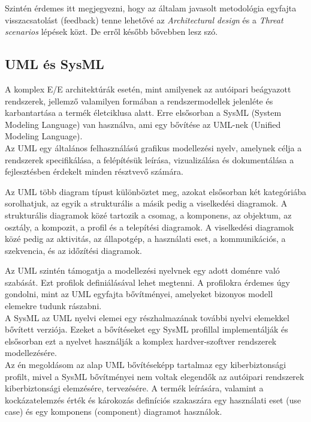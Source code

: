Szintén érdemes itt megjegyezni, hogy az általam javasolt metodológia egyfajta visszacsatolást (feedback) tenne lehetővé az \textit{Architectural design} és a \textit{Threat scenarios} lépések közt. De erről később bővebben lesz szó.

\subsection{UML és SysML}

A komplex E/E architektúrák esetén, mint amilyenek az autóipari beágyazott rendszerek, jellemző valamilyen formában a rendszermodellek jelenléte és karbantartása a termék életciklusa alatt. Erre elsősorban a SysML (System Modeling Language) van használva, ami egy bővítése az UML-nek (Unified Modeling Language).\\

Az UML egy általános felhasználású grafikus modellezési nyelv, amelynek célja a rendszerek specifikálása, a felépítésük leírása, vizualizálása és dokumentálása a fejlesztésben érdekelt minden résztvevő számára.

Az UML több diagram típust különböztet meg, azokat elsősorban két kategóriába sorolhatjuk, az egyik a strukturális a másik pedig a viselkedési diagramok. A strukturális diagramok közé tartozik a csomag, a komponens, az objektum, az osztály, a kompozit, a profil és a telepítési diagramok. A viselkedési diagramok közé pedig az aktivitás, az állapotgép, a használati eset, a kommunikációs, a szekvencia, és az időzítési diagramok.

Az UML szintén támogatja a modellezési nyelvnek egy adott doménre való szabását. Ezt profilok definiálásával lehet megtenni. A profilokra érdemes úgy gondolni, mint az UML egyfajta bővítményei, amelyeket bizonyos modell elemekre tudunk rászabni.\\


A SysML az UML nyelvi elemei egy részhalmazának további nyelvi elemekkel bővített verziója. Ezeket a bővítéseket egy SysML profillal implementálják és elsősorban ezt a nyelvet használják a komplex hardver-szoftver rendszerek modellezésére.\\


Az én megoldásom az alap UML bővítéseképp tartalmaz egy kiberbiztonsági profilt, mivel a SysML bővítményei nem voltak elegendők az autóipari rendszerek kiberbiztonsági elemzésére, tervezésére. A termék leírására, valamint a kockázatelemzés érték és károkozás definíciós szakaszára egy használati eset (use case) és egy komponens (component) diagramot használok.

